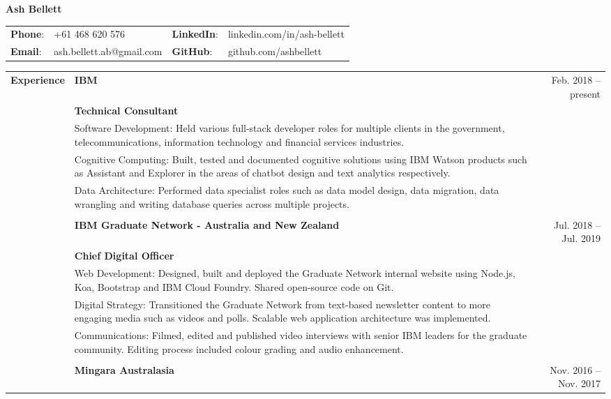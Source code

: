 \documentclass[a4paper,10pt]{letter}
\begin{document}
\vspace*{5px}

\LARGE
\textbf{Ash Bellett}\\
\large
\newline
\begin{tabular}{ @{} l l l l }
\textbf{Phone}: & +61 468 620 576 & \textbf{LinkedIn}: & linkedin.com/in/ash-bellett \\ 
\textbf{Email}: & ash.bellett.ab@gmail.com & \textbf{GitHub}: & github.com/ashbellett
\end{tabular}

\begin{tabular}{ @{} p{2.5cm} p{12cm} r }
\large
\textbf{Experience} & \textbf{IBM} & \normalsize Feb. 2018 -- present \\
 & \textbf{Technical Consultant} & \\
\large
 & Software Development: Held various full-stack developer roles for multiple clients in the government, telecommunications, information technology and financial services industries. & \\
 & Cognitive Computing: Built, tested and documented cognitive solutions using IBM Watson products such as Assistant and Explorer in the areas of chatbot design and text analytics respectively. & \\
 & Data Architecture: Performed data specialist roles such as data model design, data migration, data wrangling and writing database queries across multiple projects. & \\
 & & \\
\large
 & \textbf{IBM Graduate Network - Australia and New Zealand} & \normalsize Jul. 2018 -- Jul. 2019 \\
 & \textbf{Chief Digital Officer} & \\
\large
 & Web Development: Designed, built and deployed the Graduate Network internal website using Node.js, Koa, Bootstrap and IBM Cloud Foundry. Shared open-source code on Git. & \\
 & Digital Strategy: Transitioned the Graduate Network from text-based newsletter content to more engaging media such as videos and polls. Scalable web application architecture was implemented. & \\
 & Communications: Filmed, edited and published video interviews with senior IBM leaders for the graduate community. Editing process included colour grading and audio enhancement. & \\
 & & \\
\large
 & \textbf{Mingara Australasia} & \normalsize Nov. 2016 -- Nov. 2017 \\

\end{tabular}
\end{document}
